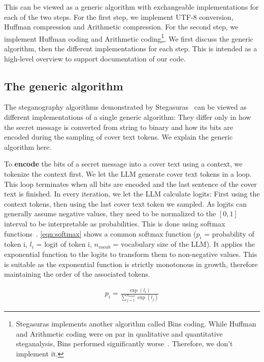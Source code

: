 This can be viewed as a generic algorithm with exchangeable implementations for each of the two steps. For the first step, we implement UTF-8 conversion, Huffman compression and Arithmetic compression. For the second step, we implement Huffman coding and Arithmetic coding\footnote{Stegasuras implements another algorithm called Bins coding. While Huffman and Arithmetic coding were on par in qualitative and quantitative steganalysis, Bins performed significantly worse~\cite{zieglerNeuralLinguisticSteganography2019}. Therefore, we don't implement it.}. We first discuss the generic algorithm, then the different implementations for each step. This is intended as a high-level overview to support documentation of our code.

\subsection{The generic algorithm}
\label{sec:theGenericAlgorithm}
The steganography algorithms demonstrated by Stegasuras~\cite{zieglerNeuralLinguisticSteganography2019} can be viewed as different implementations of a single generic algorithm: They differ only in how the secret message is converted from string to binary and how its bits are encoded during the sampling of cover text tokens. We explain the generic algorithm here.

To \textbf{encode} the bits of a secret message into a cover text using a context, we tokenize the context first. We let the \gls{LLM} generate cover text tokens in a loop. This loop terminates when all bits are encoded and the last sentence of the cover text is finished. In every iteration, we let the \gls{LLM} calculate logits: First using the context tokens, then using the last cover text token we sampled. As logits can generally assume negative values, they need to be normalized to the $ [0, 1] $ interval to be interpretable as probabilities. This is done using softmax functions~\cite{turnerIntroductionTransformers2024}. \cref{eqn:softmax} shows a common softmax function ($p_i$ = probability of token i, $l_i$ = logit of token i, $n_{vocab}$ = vocabulary size of the \gls{LLM}). It applies the exponential function to the logits to transform them to non-negative values. This is suitable as the exponential function is strictly monotonous in growth, therefore maintaining the order of the associated tokens.

\begin{align}
	p_i = \frac{\exp(l_i)}{\sum_{j=1}^{n_{vocab}} \exp(l_j)}
	\label{eqn:softmax}
\end{align}

